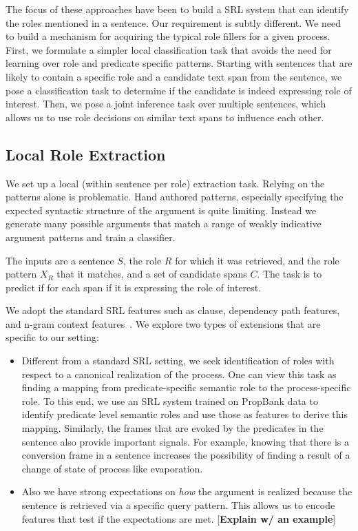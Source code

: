 The focus of these approaches have been to build a SRL system that can identify the roles mentioned in a sentence. 
Our requirement is subtly different. We need to build a mechanism for acquiring the typical role fillers for a given process. 
First, we formulate a simpler local classification task that avoids the need for learning over role and predicate specific patterns. 
Starting with sentences that are likely to contain a specific role and a candidate text span from the sentence, 
we pose a classification task to determine if the candidate  is indeed expressing role of interest. 
Then, we pose a joint inference task over multiple sentences, which allows us to use role decisions on similar 
text spans to influence each other. 

\subsection{Local Role Extraction}

We set up a local (within sentence per role) extraction task. Relying on the patterns alone is problematic. Hand authored patterns, especially specifying the expected syntactic structure of the argument is quite limiting. Instead we generate many possible arguments that match a range of weakly indicative argument patterns and train a classifier. 

The inputs are a sentence $S$, the role $R$ for which it was retrieved, and the role pattern $X_R$ that it matches, and a set of candidate spans $C$.
The task is to predict if for each span if it is expressing the role of interest. 

We adopt the standard SRL features such as clause, dependency path features, and n-gram context features~\cite{gildea2002automatic,koomen2005generalized}. 
We explore two types of extensions that are specific to our setting:
\begin{itemize}

\item Different from a standard SRL setting, we seek identification of roles with respect to a canonical realization of the process. 
One can view this task as finding a mapping from predicate-specific semantic role to the process-specific role. 
To this end, we use an SRL system trained on PropBank data to identify predicate level semantic roles and use those as features to derive this mapping.
Similarly, the frames that are evoked by the predicates in the sentence also provide important signals. For example, knowing that there is a conversion 
frame in a sentence increases the possibility of finding a result of a change of state of process like evaporation. 

\item Also we have strong expectations on {\em how} the argument is realized because the sentence is retrieved via a specific query pattern.
This allows us to encode features that test if the expectations are met. [{\bf Explain w/ an example}]

\end{itemize}


